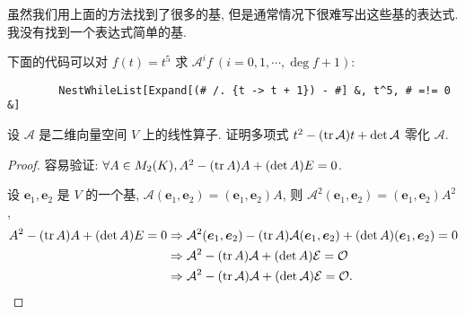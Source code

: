 \documentclass[color=black,device=normal,lang=cn,mode=geye]{elegantnote}
\begin{document}
\begin{note}
    虽然我们用上面的方法找到了很多的基, 但是通常情况下很难写出这些基的表达式. 我没有找到一个表达式简单的基.

    下面的代码可以对 $f(t)=t^5$ 求 $\mathcal{A}^if\ (i=0,1,\cdots,\deg f+1)$:
    \begin{lstlisting}
        NestWhileList[Expand[(# /. {t -> t + 1}) - #] &, t^5, # =!= 0 &]
    \end{lstlisting}
\end{note}
\begin{exercisec}[2.2.15]
    设 $\mathcal{A}$ 是二维向量空间 $V$ 上的线性算子. 证明多项式 $t^2-(\operatorname{tr}\mathcal{A})t+\det\mathcal{A}$ 零化 $\mathcal{A}$.
\end{exercisec}
\begin{proof}
    容易验证: $\forall A\in M_2(K),A^2-(\operatorname{tr} A)A+(\det A)E=0$.

    设 $\boldsymbol{e}_1,\boldsymbol{e}_2$ 是 $V$ 的一个基, $\mathcal{A}(\boldsymbol{e}_1,\boldsymbol{e}_2)=(\boldsymbol{e}_1,\boldsymbol{e}_2)A$, 则 $\mathcal{A}^2(\boldsymbol{e}_1,\boldsymbol{e}_2)=(\boldsymbol{e}_1,\boldsymbol{e}_2)A^2$,
    \begin{align*}
        A^2-(\operatorname{tr} A)A+(\det A)E=0 & \Rightarrow\mathcal{A}^2(\boldsymbol{e}_1,\boldsymbol{e}_2)-(\operatorname{tr} A)\mathcal{A}(\boldsymbol{e}_1,\boldsymbol{e}_2)+(\det A)(\boldsymbol{e}_1,\boldsymbol{e}_2)=0 \\
        & \Rightarrow\mathcal{A}^2-(\operatorname{tr} A)\mathcal{A}+(\det A)\mathcal{E}=\mathcal{O} \\
        & \Rightarrow\mathcal{A}^2-(\operatorname{tr}\mathcal{A})\mathcal{A}+(\det\mathcal{A})\mathcal{E}=\mathcal{O}.\qedhere
    \end{align*}
\end{proof}
\end{document}
